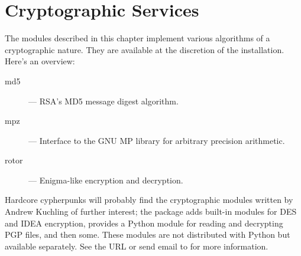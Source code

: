 \chapter{Cryptographic Services}

The modules described in this chapter implement various algorithms of
a cryptographic nature.  They are available at the discretion of the
installation.  Here's an overview:

\begin{description}

\item[md5]
--- RSA's MD5 message digest algorithm.

\item[mpz]
--- Interface to the GNU MP library for arbitrary precision arithmetic.

\item[rotor]
--- Enigma-like encryption and decryption.

\end{description}

Hardcore cypherpunks will probably find the cryptographic modules
written by Andrew Kuchling of further interest; the package adds
built-in modules for DES and IDEA encryption, provides a Python module
for reading and decrypting PGP files, and then some.  These modules
are not distributed with Python but available separately.  See the URL
 or send email to
 for more information.
